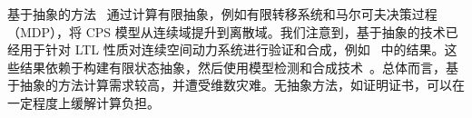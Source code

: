 基于抽象的方法~\cite{vasile2016control, leahy2019control, kress2009temporal, coogan2015traffic, fainekos2009temporal, ding2014optimal, wongpiromsarn2009receding} 通过计算有限抽象，例如有限转移系统和马尔可夫决策过程（MDP），将 CPS 模型从连续域提升到离散域。我们注意到，基于抽象的技术已经用于针对 LTL 性质对连续空间动力系统进行验证和合成，例如~\cite{henzinger1997hytech, khaled2021omegathreads, lahijanian2011temporal, rungger2016scots} 中的结果。这些结果依赖于构建有限状态抽象，然后使用模型检测和合成技术~\cite{baier2008principles, tabuada2009verification}。总体而言，基于抽象的方法计算需求较高，并遭受维数灾难。无抽象方法，如证明证书，可以在一定程度上缓解计算负担。


